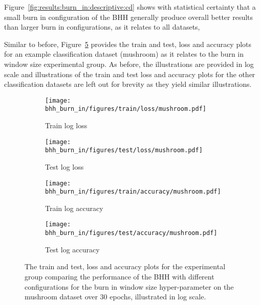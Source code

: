 Figure~\ref{fig:results:burn_in:descriptive:cd} shows with statistical certainty that a small burn in configuration of the \acs{BHH} generally produce overall better results than larger burn in configurations, as it relates to all datasets,

Similar to before, Figure~\ref{fig:results:burn_in:figures:mushroom} provides the train and test, loss and accuracy plots for an example classification dataset (mushroom) as it relates to the burn in window size experimental group. As before, the illustrations are provided in log scale and illustrations of the train and test loss and accuracy plots for the other classification datasets are left out for brevity as they yield similar illustrations.

\begin{figure}[htbp]
      \begin{subfigure}{0.5\textwidth}
            \centering
            \texttt{[image: bhh\_burn\_in/figures/train/loss/mushroom.pdf]}
            \caption{Train log loss}
            \label{fig:results:burn_in:figures:loss:train:mushroom}
      \end{subfigure}
      \begin{subfigure}{0.5\textwidth}
            \centering
            \texttt{[image: bhh\_burn\_in/figures/test/loss/mushroom.pdf]}
            \caption{Test log loss}
            \label{fig:results:burn_in:figures:loss:test:mushroom}
      \end{subfigure}
      \par\bigskip
      \begin{subfigure}{0.5\textwidth}
            \centering
            \texttt{[image: bhh\_burn\_in/figures/train/accuracy/mushroom.pdf]}
            \caption{Train log accuracy}
            \label{fig:results:burn_in:figures:accuracy:train:mushroom}
      \end{subfigure}
      \begin{subfigure}{0.5\textwidth}
            \centering
            \texttt{[image: bhh\_burn\_in/figures/test/accuracy/mushroom.pdf]}
            \caption{Test log accuracy}
            \label{fig:results:burn_in:figures:accuracy:test:mushroom}
      \end{subfigure}
      \par\bigskip
      \caption{The train and test, loss and accuracy plots for the experimental group comparing the performance of the \acs{BHH} with different configurations for the burn in window size hyper-parameter on the mushroom dataset over 30 epochs, illustrated in log scale.}
      \label{fig:results:burn_in:figures:mushroom}
\end{figure}

